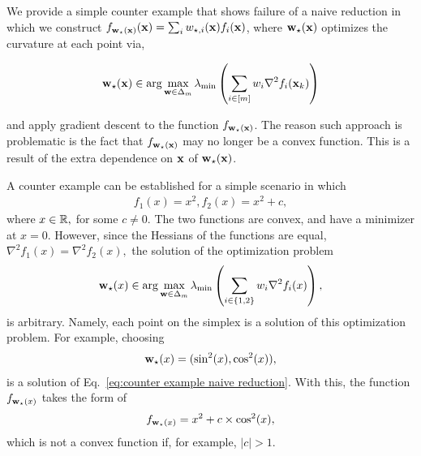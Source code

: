 We provide a simple counter example that shows failure of a naive reduction in which we construct $f_{{\mathbf{w}}_\star({\mathbf{x}})}({\mathbf{x}})=\sum_i w_{\star ,i}({\mathbf{x}}) f_i({\mathbf{x}})$, where ${\mathbf{w}}_\star({\mathbf{x}})$ optimizes the curvature at each point via,

$$
{\mathbf{w}}_\star({\mathbf{x}}) \in \arg\max_{{\mathbf{w}} \in \Delta_m} \lambda_{\min} \left(\sum_{i\in [m]} w_i \nabla^2 f_i({\mathbf{x}}_k)\right) 
$$

and apply gradient descent to the function $f_{{\mathbf{w}}_\star({\mathbf{x}})}$. The reason such approach is problematic is the fact that $f_{{\mathbf{w}}_\star({\mathbf{x}})}$ may no longer be a convex function. This is a result of the extra dependence on ${\mathbf{x}}$ of ${\mathbf{w}}_\star({\mathbf{x}})$. 

A counter example can be established for a simple scenario in which 
\begin{align*}
    f_1(x) = x^2, f_2(x) = x^2 + c,
\end{align*}
where $x\in \mathbb{R},$ for some $c\neq 0$. The two functions are convex, and have a minimizer at $x=0$. However, since the Hessians of the functions are equal, $\nabla^2 f_1(x)= \nabla^2 f_2(x),$ the solution of the optimization problem
\begin{align}
    \label{eq:counter example naive reduction}
    {\mathbf{w}}_\star(x) \in \arg\max_{{\mathbf{w}} \in \Delta_m} \lambda_{\min} \left(\sum_{i\in \{1,2\}} w_i \nabla^2 f_i(x)\right), 
\end{align}
is arbitrary. Namely, each point on the simplex is a solution of this optimization problem. For example, choosing
\begin{align*}
    {\mathbf{w}}_\star(x) = (\sin^2(x), \cos^2(x)),
\end{align*}
is a solution of Eq.~\eqref{eq:counter example naive reduction}. With this, the function $f_{{\mathbf{w}}_\star(x)}$ takes the form of
\begin{align*}
    f_{{\mathbf{w}}_\star(x)}= x^2 + c \times \cos^2(x),
\end{align*}
which is not a convex function if, for example, $|c|>1$.

